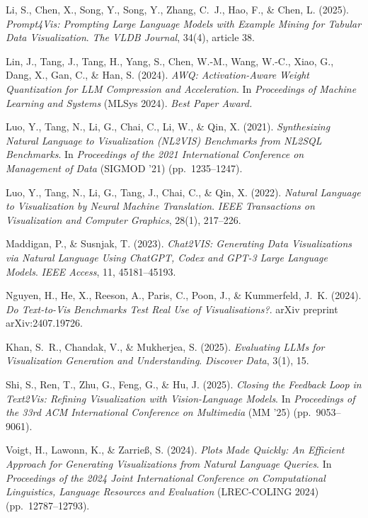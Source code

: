 \documentclass[a4paper,oneside,bibliography=totoc]{scrbook}
\begin{document}
\begin{thebibliography}{}
  Li, S., Chen, X., Song, Y., Song, Y., Zhang, C.~J., Hao, F., \& Chen, L. (2025).
  \textit{Prompt4Vis: Prompting Large Language Models with Example Mining for Tabular Data Visualization}.
  \textit{The VLDB Journal}, 34(4), article 38.

  Lin, J., Tang, J., Tang, H., Yang, S., Chen, W.-M., Wang, W.-C., Xiao, G., Dang, X., Gan, C., \& Han, S. (2024).
  \textit{AWQ: Activation-Aware Weight Quantization for LLM Compression and Acceleration}.
  In \textit{Proceedings of Machine Learning and Systems} (MLSys 2024). \textit{Best Paper Award.}

  Luo, Y., Tang, N., Li, G., Chai, C., Li, W., \& Qin, X. (2021).
  \textit{Synthesizing Natural Language to Visualization (NL2VIS) Benchmarks from NL2SQL Benchmarks}.
  In \textit{Proceedings of the 2021 International Conference on Management of Data} (SIGMOD '21) (pp.\ 1235--1247).

  Luo, Y., Tang, N., Li, G., Tang, J., Chai, C., \& Qin, X. (2022).
  \textit{Natural Language to Visualization by Neural Machine Translation}.
  \textit{IEEE Transactions on Visualization and Computer Graphics}, 28(1), 217--226.

  Maddigan, P., \& Susnjak, T. (2023).
  \textit{Chat2VIS: Generating Data Visualizations via Natural Language Using ChatGPT, Codex and GPT-3 Large Language Models}.
  \textit{IEEE Access}, 11, 45181--45193.

  Nguyen, H., He, X., Reeson, A., Paris, C., Poon, J., \& Kummerfeld, J.~K. (2024).
  \textit{Do Text-to-Vis Benchmarks Test Real Use of Visualisations?}.
  arXiv preprint arXiv:2407.19726.

  Khan, S.~R., Chandak, V., \& Mukherjea, S. (2025).
  \textit{Evaluating LLMs for Visualization Generation and Understanding}.
  \textit{Discover Data}, 3(1), 15.

  Shi, S., Ren, T., Zhu, G., Feng, G., \& Hu, J. (2025).
  \textit{Closing the Feedback Loop in Text2Vis: Refining Visualization with Vision-Language Models}.
  In \textit{Proceedings of the 33rd ACM International Conference on Multimedia} (MM '25) (pp.\ 9053--9061).

  Voigt, H., Lawonn, K., \& Zarrie\ss, S. (2024).
  \textit{Plots Made Quickly: An Efficient Approach for Generating Visualizations from Natural Language Queries}.
  In \textit{Proceedings of the 2024 Joint International Conference on Computational Linguistics, Language Resources and Evaluation} (LREC-COLING 2024) (pp.\ 12787--12793).


\end{thebibliography}
\end{document}
